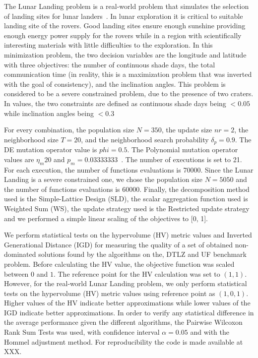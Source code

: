 The Lunar Landing problem is a real-world problem that simulates the selection of landing sites for lunar landers~\citep{MoonOrbitingSatellite2015}. In lunar exploration it is critical to suitable landing site of the rovers. Good landing sites ensure enough sunshine providing enough energy power supply for the rovers while in a region with scientifically interesting materials with little difficulties to the exploration. In this minimization problem, the two decision variables are the longitude and latitude with three objectives: the number of continuous shade days, the total communication time (in reality, this is a maximization problem that was inverted with the goal of consistency), and the inclination angles. This problem is considered to be a severe constrained problem, due to the presence of two craters. In values, the two constraints are defined as continuous shade days being $ < 0.05$ while inclination angles being $<0.3$



For every combination, the population size $N = 350$, the update size $nr = 2$, the neighborhood size $T = 20$, and the neighborhood search probability $\delta_p = 0.9$. The DE mutation operator value is $phi=0.5$. The Polynomial mutation operator values are $\eta_m 20$ and $p_m = 0.03333333$~\cite{campelo2018moeadr}. The number of executions is set to 21. For each execution, the number of functions evaluations is 70000. Since the Lunar Landing is a severe constrained one, we chose the population size $N = 5050$ and the number of functions evaluations is 60000. Finally, the decomposition method used is the Simple-Lattice Design (SLD), the scalar aggregation function used is Weighted Sum (WS), the update strategy used is the Restricted update strategy and we performed a simple linear scaling of the objectives to [0, 1].


We perform statistical tests on the hypervolume (HV) metric values and Inverted Generational Distance (IGD) for measuring the quality of a set of obtained non-dominated solutions found by the algorithms on the, DTLZ and UF benchmark problem. Before calculating the HV value, the objective function was scaled between $0$ and $1$. The reference point for the HV calculation was set to $(1, 1)$. However, for the real-world Lunar Landing problem, we only perform statistical tests on the hypervolume (HV) metric values using reference point as $(1, 0, 1)$. Higher values of the HV indicate better approximations while lower values of the IGD indicate better approximations. In order to verify any statistical difference in the average performance given the different algorithms, the Pairwise Wilcoxon Rank Sum Tests was used, with confidence interval $\alpha = 0.05$ and with the Hommel adjustment method. For reproducibility the code is made available at XXX.

